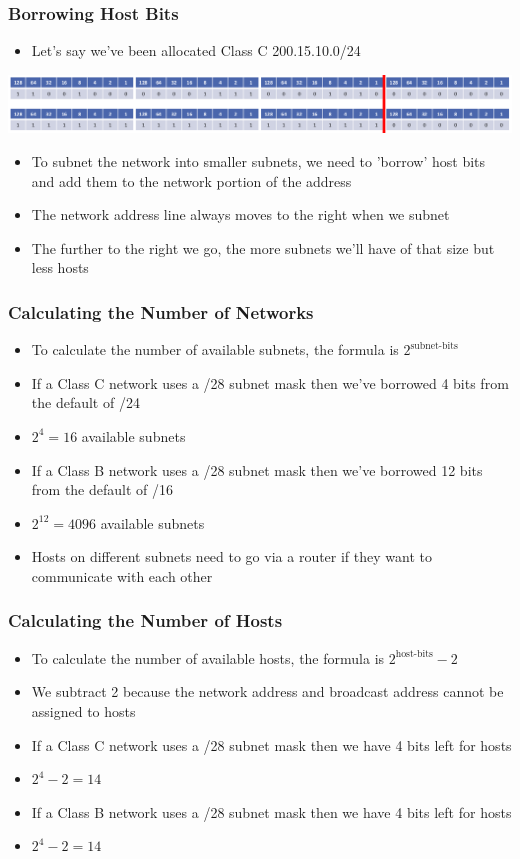 \documentclass[pdflatex,compress]{beamer}
\begin{document}
\begin{frame}
	\frametitle{Borrowing Host Bits}
	\begin{itemize}
		\item Let's say we've been allocated Class C 200.15.10.0/24
	\end{itemize}

	\begin{center}
			\includegraphics[width=1\linewidth]{img/img02}
	\end{center}

	\begin{itemize}
		\item To subnet the network into smaller subnets, we need to 'borrow' host bits and add them to the network portion of the address
		\item The network address line always moves to the right when we subnet
		\item The further to the right we go, the more subnets we'll have of that size but less hosts
	\end{itemize}
\end{frame}

\begin{frame}
	\frametitle{Calculating the Number of Networks}
	\begin{itemize}
		\item To calculate the number of available subnets, the formula is $ 2^{\text{subnet-bits}} $
		\item If a Class C network uses a /28 subnet mask then we've borrowed 4 bits from the default of /24
		\item $ 2^4 = 16 $ available subnets
		\item If a Class B network uses a /28 subnet mask then we've borrowed 12 bits from the default of /16
		\item $ 2^{12} = 4096 $ available subnets
		\item Hosts on different subnets need to go via a router if they want to
		communicate with each other
	\end{itemize}
\end{frame}

\begin{frame}
	\frametitle{Calculating the Number of Hosts}
	\begin{itemize}
		\item To calculate the number of available hosts, the formula is $ 2^{\text{host-bits}} - 2 $
		\item We subtract 2 because the network address and broadcast address cannot be assigned to hosts
		\item If a Class C network uses a /28 subnet mask then we have 4 bits left for hosts
		\item $ 2^4 - 2 = 14 $
		\item If a Class B network uses a /28 subnet mask then we have 4 bits left for hosts
		\item $ 2^4 - 2 = 14 $
	\end{itemize}
\end{frame}
\end{document}
